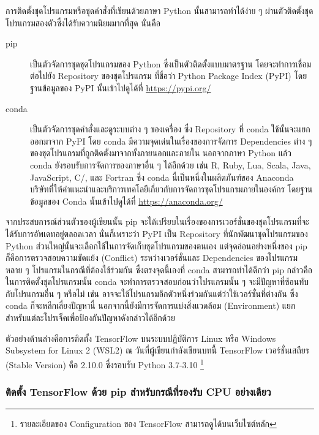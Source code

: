 การติดตั้งชุดโปรแกรมหรือชุดคำสั่งที่เขียนด้วยภาษา Python นั้นสามารถทำได้ง่าย ๆ ผ่านตัวติดตั้งชุดโปรแกรมสองตัวซึ่งได้รับความนิยมมากที่สุด นั่นคือ

\begin{description}
    \item[pip] เป็นตัวจัดการชุดชุดโปรแกรมของ Python ซึ่งเป็นตัวติดตั้งแบบมาตรฐาน โดยจะทำการเชื่อมต่อไปยัง Repository ของชุดโปรแกรม%
    ที่ชื่อว่า Python Package Index (PyPI) โดยฐานข้อมูลของ PyPI นั้นเข้าไปดูได้ที่ \url{https://pypi.org/}
    
    \item[conda] เป็นตัวจัดการชุดคำสั่งและดูระบบต่าง ๆ ของเครื่อง ซึ่ง Repository ที่ conda ใช้นั้นจะแยกออกมาจาก PyPI โดย conda 
    มีความจุดเด่นในเรื่องของการจัดการ Dependencies ต่าง ๆ ของชุดโปรแกรมที่ถูกติดตั้งมาจากทั้งภายนอกและภายใน นอกจากภาษา Python 
    แล้ว conda ยังรอบรับการจัดการของภาษาอื่น ๆ ได้อีกด้วย เช่น R, Ruby, Lua, Scala, Java, JavaScript, C/\cpp, และ Fortran
    ซึ่ง conda นี้เป็นหนึ่งในผลิตภันฑ์ของ Anaconda บริษัทที่ให้คำแนะนำและบริการเทคโลยีเกี่ยวกับการจัดการชุดโปรแกรมภายในองค์กร
    โดยฐานข้อมูลของ Conda นั้นเข้าไปดูได้ที่ \url{https://anaconda.org/}
\end{description}

จากประสบการณ์ส่วนตัวของผู้เขียนนั้น pip จะได้เปรียบในเรื่องของการเวอร์ชั่นของชุดโปรแกรมที่จะได้รับการอัพเดทอยู่ตลอดเวลา นั่นก็เพราะว่า PyPI
เป็น Repository ที่นักพัฒนาชุดโปรแกรมของ Python ส่วนใหญ่นั้นจะเลือกใช้ในการจัดเก็บชุดโปรแกรมของตนเอง แต่จุดอ่อนอย่างหนึ่งของ pip 
ก็คือการตรวจสอบความขัดแย้ง (Conflict) ระหว่างเวอร์ชั่นและ Dependencies ของโปรแกรมหลาย ๆ โปรแกรมในกรณีที่ต้องใช้ร่วมกัน 
ซึ่งตรงจุดนี้เองที่ conda สามารถทำได้ดีกว่า pip กล่าวคือ ในการติดตั้งชุดโปรแกรมนั้น conda จะทำการตรวจสอบก่อนว่าโปรแกรมนั้น ๆ 
จะมีปัญหาที่ซ้อนทับกับโปรแกรมอื่น ๆ หรือไม่ เช่น อาจจะใช้โปรแกรมอีกตัวหนึ่งร่วมกันแต่ว่าใช้เวอร์ชั่นที่ต่างกัน ซึ่ง conda ก็จะหลีกเลี่ยงปัญหานี้
นอกจากนี้ยังมีการจัดการแบ่งสิ่งแวดล้อม (Environment) แยกสำหรับแต่ละโปรเจ็คเพื่อป้องกันปัญหาดังกล่าวได้อีกด้วย

ตัวอย่างด้านล่างคือการติดตั้ง TensorFlow บนระบบปฏิบัติการ Linux หรือ Windows Subsystem for Linux 2 (WSL2)
\noindent ณ วันที่ผู้เขียนกำลังเขียนบทนี้ TensorFlow เวอร์ชั่นเสถียร (Stable Version) คือ 2.10.0 ซึ่งรอบรับ Python 3.7-3.10%
\footnote{รายละเอียดของ Configuration ของ TensorFlow สามารถดูได้บนเว็บไซต์หลัก}

\subsubsection{ติดตั้ง TensorFlow ด้วย pip สำหรับกรณีที่รองรับ CPU อย่างเดียว}

